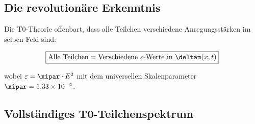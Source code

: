 	\subsection{Die revolutionäre Erkenntnis}
	
	Die T0-Theorie offenbart, dass alle Teilchen verschiedene Anregungsstärken im selben Feld sind:
	
	\begin{equation}
		\boxed{\text{Alle Teilchen} = \text{Verschiedene } \varepsilon \text{-Werte in } \deltam(x,t)}
		\label{eq:universal_particle_principle}
	\end{equation}
	
	wobei $\varepsilon = \xipar \cdot E^2$ mit dem universellen Skalenparameter $\xipar = 1{,}33 \times 10^{-4}$.
	
	\subsection{Vollständiges T0-Teilchenspektrum}
	
